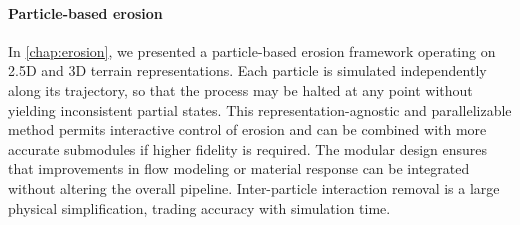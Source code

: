 \paragraph{Particle-based erosion} In \cref{chap:erosion}, we presented a particle-based erosion framework operating on 2.5D and 3D terrain representations. Each particle is simulated independently along its trajectory, so that the process may be halted at any point without yielding inconsistent partial states. This representation-agnostic and parallelizable method permits interactive control of erosion and can be combined with more accurate submodules if higher fidelity is required. The modular design ensures that improvements in flow modeling or material response can be integrated without altering the overall pipeline. Inter-particle interaction removal is a large physical simplification, trading accuracy with simulation time. 





